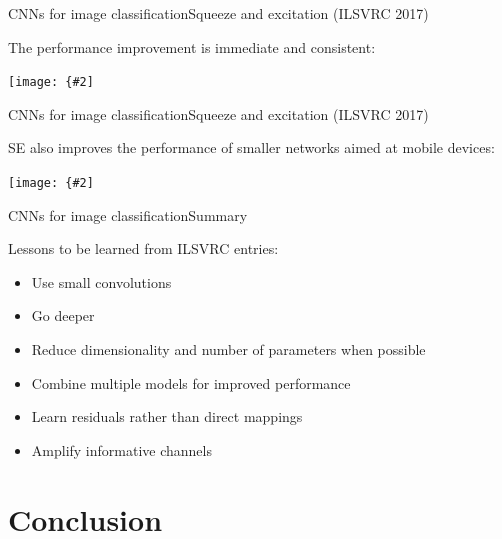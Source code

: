 \documentclass{beamer}
\newcommand{\myfig}[3]{\centerline{\texttt{[image: \{\#2]}}}
\begin{document}
\begin{frame}{CNNs for image classification}{Squeeze and excitation (ILSVRC 2017)}

  The performance improvement is immediate and consistent:

  \medskip
  
  \myfig{4.5in}{hu-fig4}{Hu, Shen, and Sun (2018), Fig.\ 4}
  
\end{frame}


\begin{frame}{CNNs for image classification}{Squeeze and excitation (ILSVRC 2017)}

  SE also improves the performance of smaller networks aimed at mobile
  devices:

  \medskip
  
  \myfig{4in}{hu-table3}{Hu, Shen, and Sun (2018), Table 3}
  
\end{frame}


\begin{frame}{CNNs for image classification}{Summary}

  Lessons to be learned from ILSVRC entries:
  \begin{itemize}
  \item Use small convolutions
  \item Go deeper
  \item Reduce dimensionality and number of parameters when possible
  \item Combine multiple models for improved performance
  \item Learn residuals rather than direct mappings
  \item Amplify informative channels
  \end{itemize}
  
\end{frame}

\section{Conclusion}
\end{document}
